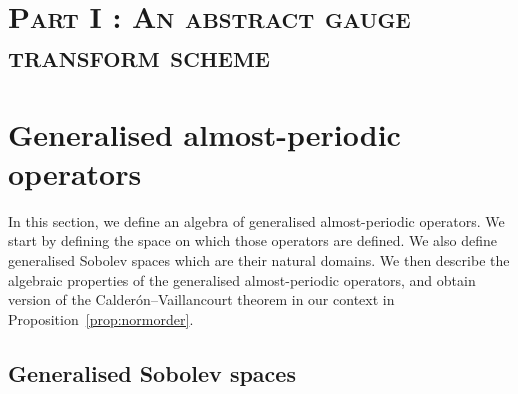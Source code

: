 \documentclass[AHL,Unicode,longabstracts,published]{cedram}
\begin{document}
\section*{\textsc{Part I : An abstract gauge transform scheme}}

\section{Generalised almost-periodic operators} \label{sec:operators}

In this section, we define an algebra of generalised almost-periodic operators. We start by defining the space on which those operators are defined. We also define generalised Sobolev spaces which are their natural domains. We then describe the algebraic properties of the generalised almost-periodic operators, and obtain version of the Calder\'on--Vaillancourt theorem in our context in Proposition~\ref{prop:normorder}.

\subsection{Generalised Sobolev spaces}
\end{document}
